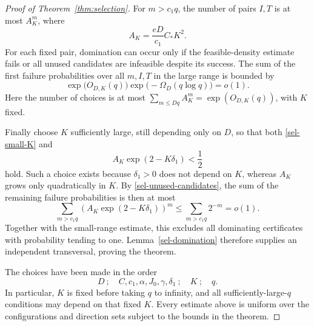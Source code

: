 \begin{proof}[Proof of Theorem~\ref{thm:selection}]
For $m>c_1q$, the number of pairs $I,T$ is at most $A_K^m$, where
\begin{equation}\label{sel-large-count}
 A_K=\frac{eD}{c_1}C_*K^2.
\end{equation}
For each fixed pair, domination can occur only if the feasible-density
estimate fails or all unused candidates are infeasible despite its
success.  The sum of the first failure probabilities over all
$m,I,T$ in the large range is bounded by
\[
 \exp\bigl(O_{D,K}(q)\bigr)
 \exp\bigl(-\Omega_D(q\log q)\bigr)=o(1).
\]
Here the number of choices is at most
$\sum_{m\le Dq}A_K^m=\exp(O_{D,K}(q))$, with $K$ fixed.

Finally choose $K$ sufficiently large, still depending only on $D$, so
that both \eqref{sel-small-K} and
\begin{equation}\label{sel-large-K}
 A_K\exp(2-K\delta_1)<\frac12
\end{equation}
hold.  Such a choice exists because $\delta_1>0$ does not depend on $K$,
whereas $A_K$ grows only quadratically in $K$.  By
\eqref{sel-unused-candidates}, the sum of the remaining failure
probabilities is then at most
\[
 \sum_{m>c_1q}
 \left(A_K\exp(2-K\delta_1)\right)^m
 \le\sum_{m>c_1q}2^{-m}=o(1).
\]
Together with the small-range estimate, this excludes all dominating
certificates with probability tending to one.  Lemma~\ref{sel-domination}
therefore supplies an independent transversal, proving the theorem.

The choices have been made in the order
\[
 D\ ;\quad C,c_1,\alpha,J_0,\gamma,\delta_1\ ;\quad K\ ;\quad q.
\]
In particular, $K$ is fixed before taking $q$ to infinity, and all
sufficiently-large-$q$ conditions may depend on that fixed $K$.
Every estimate above is uniform over the configurations and direction
sets subject to the bounds in the theorem.
\end{proof}
